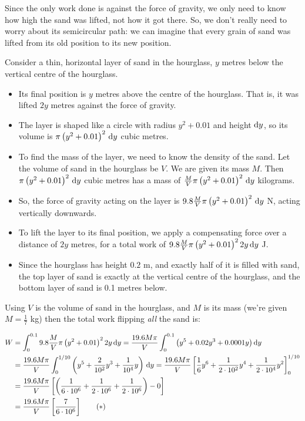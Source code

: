 \begin{solution}
Since the only work done is against the force of gravity, we only need to know how high the sand was lifted, not how it got there. So, we don't really need to worry about its semicircular path: we can imagine that every grain of sand was lifted from its old position to its new position.

Consider a thin, horizontal layer of sand in the hourglass, $y$ metres below the vertical centre of the hourglass.
\begin{itemize}
\item Its final position is $y$ metres above the centre of the hourglass. That is, it was lifted $2y$ metres against the force of gravity.
\item The layer is shaped like a circle with radius $y^2+0.01$ and height $\mathrm{d}y$, so its volume is $\pi\left(y^2+0.01\right)^2\,\mathrm{d}y$ cubic metres.
\item To find the mass of the layer, we need to know the density of the sand. Let the volume of sand in the hourglass be $V$. We are given its mass $M$. Then $\pi\left(y^2+0.01\right)^2\,\mathrm{d}y$ cubic metres has a mass of $\frac{M}{V}\pi\left(y^2+0.01\right)^2\,\mathrm{d}y$ kilograms.
\item So, the force of gravity acting on the layer is $9.8\frac{M}{V}\pi\left(y^2+0.01\right)^2\,\mathrm{d}y$ N, acting vertically downwards.
\item To lift the layer to its final position, we apply a compensating force over a distance of $2y$ metres, for a total work of $9.8\frac{M}{V}\pi\left(y^2+0.01\right)^22y\,\mathrm{d}y$ J.
\item Since the hourglass has height $0.2$ m, and exactly half of it is filled with sand, the top layer of sand is exactly at the vertical centre of the hourglass, and the bottom layer of sand is  0.1 metres below.
\end{itemize}
Using $V$ is the volume of sand in the hourglass, and $M$ is its mass (we're given $M  =\frac{1}{7}$ kg) then  the total work flipping \emph{all} the sand is:

\begin{align*}
W &= \int_0^{0.1} 9.8\frac{M}{V}\pi\left(y^2+0.01\right)^22y\,\mathrm{d}y = \frac{19.6M\pi}{V}\int_0^{0.1}\big(y^5+0.02y^3+0.0001y\big)\,\mathrm{d}y\\
&= \frac{19.6M\pi}{V}\int_0^{1/10}\left(y^5+\frac{2}{10^2}y^3+\frac{1}{10^4}y\right)\,\mathrm{d}y
= \frac{19.6M\pi}{V}\left[\frac{1}{6}y^6+\frac{1}{2\cdot10^2}y^4+\frac{1}{2\cdot 10^4}y^2\right]_0^{1/10}\\
&= \frac{19.6M\pi}{V}\left[\left(\frac{1}{6\cdot 10^6}+\frac{1}{2\cdot10^6}+\frac{1}{2\cdot 10^6}\right) - 0\right]\\
&= \frac{19.6M\pi}{V}\left[\frac{7}{6\cdot 10^6}\right]\tag{$*$}
\end{align*}


\end{solution}
